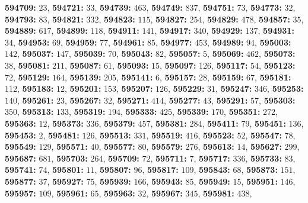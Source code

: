 \textsf{\bfseries 594709:} $23$, \textsf{\bfseries 594721:} $33$, \textsf{\bfseries 594739:} $463$, \textsf{\bfseries 594749:} $837$, \textsf{\bfseries 594751:} $73$, \textsf{\bfseries 594773:} $32$, \textsf{\bfseries 594793:} $83$, \textsf{\bfseries 594821:} $332$, \textsf{\bfseries 594823:} $115$, \textsf{\bfseries 594827:} $254$, \textsf{\bfseries 594829:} $478$, \textsf{\bfseries 594857:} $35$, \textsf{\bfseries 594889:} $617$, \textsf{\bfseries 594899:} $118$, \textsf{\bfseries 594911:} $141$, \textsf{\bfseries 594917:} $340$, \textsf{\bfseries 594929:} $137$, \textsf{\bfseries 594931:} $34$, \textsf{\bfseries 594953:} $69$, \textsf{\bfseries 594959:} $77$, \textsf{\bfseries 594961:} $85$, \textsf{\bfseries 594977:} $453$, \textsf{\bfseries 594989:} $94$, \textsf{\bfseries 595003:} $142$, \textsf{\bfseries 595037:} $147$, \textsf{\bfseries 595039:} $70$, \textsf{\bfseries 595043:} $82$, \textsf{\bfseries 595057:} $5$, \textsf{\bfseries 595069:} $462$, \textsf{\bfseries 595073:} $38$, \textsf{\bfseries 595081:} $211$, \textsf{\bfseries 595087:} $61$, \textsf{\bfseries 595093:} $15$, \textsf{\bfseries 595097:} $126$, \textsf{\bfseries 595117:} $54$, \textsf{\bfseries 595123:} $72$, \textsf{\bfseries 595129:} $164$, \textsf{\bfseries 595139:} $205$, \textsf{\bfseries 595141:} $6$, \textsf{\bfseries 595157:} $28$, \textsf{\bfseries 595159:} $67$, \textsf{\bfseries 595181:} $112$, \textsf{\bfseries 595183:} $12$, \textsf{\bfseries 595201:} $153$, \textsf{\bfseries 595207:} $126$, \textsf{\bfseries 595229:} $31$, \textsf{\bfseries 595247:} $346$, \textsf{\bfseries 595253:} $140$, \textsf{\bfseries 595261:} $23$, \textsf{\bfseries 595267:} $32$, \textsf{\bfseries 595271:} $414$, \textsf{\bfseries 595277:} $43$, \textsf{\bfseries 595291:} $57$, \textsf{\bfseries 595303:} $350$, \textsf{\bfseries 595313:} $133$, \textsf{\bfseries 595319:} $194$, \textsf{\bfseries 595333:} $425$, \textsf{\bfseries 595339:} $170$, \textsf{\bfseries 595351:} $272$, \textsf{\bfseries 595363:} $12$, \textsf{\bfseries 595373:} $336$, \textsf{\bfseries 595379:} $457$, \textsf{\bfseries 595381:} $284$, \textsf{\bfseries 595411:} $79$, \textsf{\bfseries 595451:} $136$, \textsf{\bfseries 595453:} $2$, \textsf{\bfseries 595481:} $126$, \textsf{\bfseries 595513:} $331$, \textsf{\bfseries 595519:} $416$, \textsf{\bfseries 595523:} $52$, \textsf{\bfseries 595547:} $78$, \textsf{\bfseries 595549:} $129$, \textsf{\bfseries 595571:} $40$, \textsf{\bfseries 595577:} $80$, \textsf{\bfseries 595579:} $276$, \textsf{\bfseries 595613:} $14$, \textsf{\bfseries 595627:} $299$, \textsf{\bfseries 595687:} $681$, \textsf{\bfseries 595703:} $264$, \textsf{\bfseries 595709:} $72$, \textsf{\bfseries 595711:} $7$, \textsf{\bfseries 595717:} $336$, \textsf{\bfseries 595733:} $83$, \textsf{\bfseries 595741:} $74$, \textsf{\bfseries 595801:} $11$, \textsf{\bfseries 595807:} $96$, \textsf{\bfseries 595817:} $109$, \textsf{\bfseries 595843:} $68$, \textsf{\bfseries 595873:} $151$, \textsf{\bfseries 595877:} $37$, \textsf{\bfseries 595927:} $75$, \textsf{\bfseries 595939:} $166$, \textsf{\bfseries 595943:} $85$, \textsf{\bfseries 595949:} $15$, \textsf{\bfseries 595951:} $146$, \textsf{\bfseries 595957:} $109$, \textsf{\bfseries 595961:} $65$, \textsf{\bfseries 595963:} $32$, \textsf{\bfseries 595967:} $345$, \textsf{\bfseries 595981:} $438$, 
